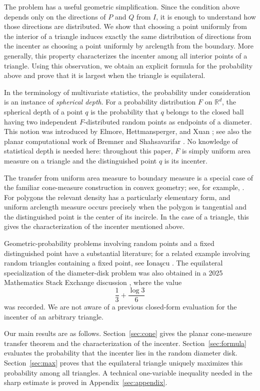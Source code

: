 \documentclass[11pt]{article}
\theoremstyle{definition}
\theoremstyle{remark}
\begin{document}
The problem has a useful geometric simplification.  Since the condition
above depends only on the directions of $P$ and $Q$ from $I$, it is
enough to understand how those directions are distributed.  We show
that choosing a point uniformly from the interior of a triangle induces
exactly the same distribution of directions from the incenter as
choosing a point uniformly by arclength from the boundary.  More
generally, this property characterizes the incenter among all interior
points of a triangle.  Using this observation, we obtain an explicit
formula for the probability above and prove that it is largest when the
triangle is equilateral.

In the terminology of multivariate statistics, the probability under
consideration is an instance of \emph{spherical depth}.  For a
probability distribution $F$ on $\mathbb R^d$, the spherical depth of a
point $q$ is the probability that $q$ belongs to the closed ball having
two independent $F$-distributed random points as endpoints of a
diameter.  This notion was introduced by Elmore, Hettmansperger, and
Xuan \cite{ElmoreHettmanspergerXuan}; see also the planar computational
work of Bremner and Shahsavarifar \cite{BremnerShahsavarifar}.  No
knowledge of statistical depth is needed here: throughout this paper,
$F$ is simply uniform area measure on a triangle and the distinguished
point $q$ is its incenter.

The transfer from uniform area measure to boundary measure is a special
case of the familiar cone-measure construction in convex geometry; see,
for example, \cite{Schneider,BoroczkyHenk}.  For polygons the relevant
density has a particularly elementary form, and uniform arclength
measure occurs precisely when the polygon is tangential and the
distinguished point is the center of its incircle.  In the case of a
triangle, this gives the characterization of the incenter mentioned
above.

Geometric-probability problems involving random points and a fixed
distinguished point have a substantial literature; for a related
example involving random triangles containing a fixed point, see
Iona\c{s}cu \cite{Ionascu}.  The equilateral specialization of the
diameter-disk problem was also obtained in a 2025 Mathematics Stack
Exchange discussion \cite{DanMSE}, where the value
\[
 \frac13+\frac{\log3}{6}
\]
was recorded.  We are not aware of a previous closed-form evaluation
for the incenter of an arbitrary triangle.

Our main results are as follows.  Section~\ref{sec:cone} gives the
planar cone-measure transfer theorem and the characterization of the
incenter.  Section~\ref{sec:formula} evaluates the probability that the
incenter lies in the random diameter disk.  Section~\ref{sec:max} proves
that the equilateral triangle uniquely maximizes this probability among
all triangles.  A technical one-variable inequality needed in the sharp
estimate is proved in Appendix~\ref{sec:appendix}.
\end{document}
